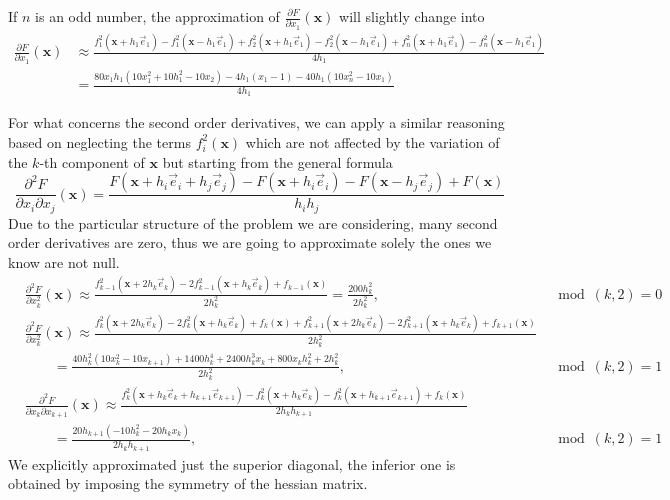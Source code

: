 If $n$ is an odd number, the approximation of $\frac{\partial F}{\partial x_1} (\mathbf{x})$ will slightly change into 
\begin{align*}
\frac{\partial F}{\partial x_1} (\mathbf{x}) & \approx  \frac{f_{1}^2(\mathbf{x} + h_1 \vec{e}_1) - f_{1}^2(\mathbf{x} - h_1 \vec{e}_1) + f_{2}^2(\mathbf{x} + h_1 \vec{e}_1) - f_{2}^2(\mathbf{x} - h_1 \vec{e}_1) + f_n^2(\mathbf{x} + h_1 \vec{e}_1) - f_n^2(\mathbf{x} - h_1\vec{e}_1)}{4h_1} \\ &
 = \frac{80x_1 h_1(10x_1^2 + 10 h_1^2 -10x_{2}) - 4h_1 (x_1 -1) -40h_1 (10x_n^2 - 10x_1) }{4h_1}
\end{align*}

For what concerns the second order derivatives, we can apply a similar reasoning based on neglecting the terms $f_i^2(\mathbf{x})$ which are not affected by the variation of the $k$-th component of $\mathbf{x}$ but starting from the general formula
$$ \frac{\partial^2 F}{\partial x_i \partial x_j} (\mathbf{x})  = \frac{F(\mathbf{x} + h_i \vec{e}_i + h_j \vec{e}_j) - F(\mathbf{x} + h_i \vec{e}_i) - F(\mathbf{x} - h_j \vec{e}_j) + F(\mathbf{x})}{h_i h_j}$$
Due to the particular structure of the problem we are considering, many second order derivatives are zero, thus we are going to approximate solely the ones we know are not null.
\begin{align*}
    & \frac{\partial^2 F}{\partial x_k^2} (\mathbf{x}) \approx \frac{f_{k-1}^2 (\mathbf{x} + 2h_k \vec{e}_k) - 2 f_{k-1}^2 (\mathbf{x} + h_k \vec{e}_k) + f_{k-1}(\mathbf{x})}{2h_k^2} = \frac{200h_k^2}{2 h_k^2}, & \mod(k,2) = 0 \\
    & \frac{\partial^2 F}{\partial x_k^2} (\mathbf{x}) \approx \frac{f_{k}^2 (\mathbf{x} + 2h_k \vec{e}_k) - 2 f_{k}^2 (\mathbf{x} + h_k \vec{e}_k) + f_{k}(\mathbf{x}) + f_{k+1}^2 (\mathbf{x} + 2h_k \vec{e}_k) - 2 f_{k+1}^2 (\mathbf{x} + h_k \vec{e}_k) + f_{k+1}(\mathbf{x})}{2h_k^2} \\
    & \qquad = \frac{40h_k^2 (10x_k^2 - 10x_{k+1}) + 1400 h_k^4 + 2400h_k^3 x_k + 800 x_k h_k^2 + 2h_k^2}{2 h_k^2}, & \mod(k,2) = 1 \\
    & \frac{\partial^2 F}{\partial x_k \partial x_{k+1}} (\mathbf{x}) \approx \frac{f_{k}^2 (\mathbf{x} + h_k \vec{e}_k + h_{k+1} \vec{e}_{k+1}) - f_{k}^2 (\mathbf{x} + h_k \vec{e}_k) - f_{k}^2 (\mathbf{x} + h_{k+1} \vec{e}_{k+1}) + f_{k}(\mathbf{x})}{2h_k h_{k+1}} \\
    & \qquad = \frac{20h_{k+1} (-10h_k^2 - 20h_k x_k)}{2h_k h_{k+1}}, & \mod(k,2) = 1
\end{align*}
We explicitly approximated just the superior diagonal, the inferior one is obtained by imposing the symmetry of the hessian matrix.

